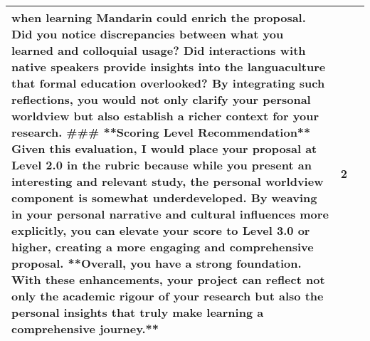 \begin{longtable}{|p{}|p{}|p{}|}
when learning Mandarin could enrich the proposal. Did you notice discrepancies between what you learned and colloquial usage? Did interactions with native speakers provide insights into the languaculture that formal education overlooked? By integrating such reflections, you would not only clarify your personal worldview but also establish a richer context for your research.  \#\#\# **Scoring Level Recommendation** Given this evaluation, I would place your proposal at Level 2.0 in the rubric because while you present an interesting and relevant study, the personal worldview component is somewhat underdeveloped. By weaving in your personal narrative and cultural influences more explicitly, you can elevate your score to Level 3.0 or higher, creating a more engaging and comprehensive proposal.  **Overall, you have a strong foundation. With these enhancements, your project can reflect not only the academic rigour of your research but also the personal insights that truly make learning a comprehensive journey.** & 2 \\
\hline

\end{longtable}
